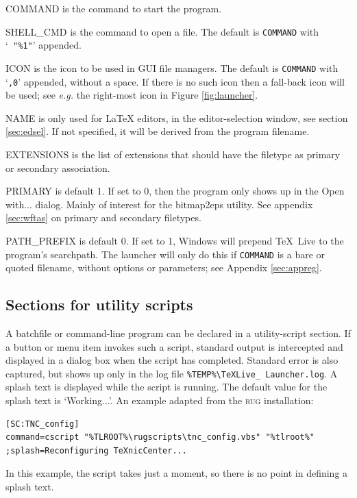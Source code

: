 \documentclass[11pt,a4paper,oneside]{report}
\def\TL{\TeX~Live}
\def\mysc#1{{\rmfamily\textsc{#1}}}
\def\RUG{\mysc{rug}}
\def\dbr{\discretionary{}{}{}}
\let\bsl\textbackslash
\def\bslb{\bsl\discretionary{}{}{}}
\newenvironment{ttdesc}{%
  \def\descriptionlabel##1{\hspace\labelsep\ttfamily\selectfont ##1}%
  \description}{\enddescription}
\begin{document}
\begin{ttdesc}
\item [COMMAND] is the command to start the program.
\item [SHELL\_CMD] is the command to open a file. The default is
  \texttt{COMMAND} with `\texttt{~"\%1"}' appended.
\item[ICON] is the icon to be used in GUI file managers. The default
  is \texttt{COMMAND} with `\texttt{,0}' appended, without a
  space. If there is no such icon then a fall-back icon will be
  used; see \emph{e.g.} the right-most icon in Figure
  \ref{fig:launcher}.
\item[NAME] is only used for \LaTeX{} editors, in the
  editor-selection window, see section \ref{sec:edsel}. If not
  specified, it will be derived from the program filename.
\item[EXTENSIONS] is the list of extensions that should have the
  filetype as primary or secondary association.
\item[PRIMARY] is default 1. If set to 0, then the program only
  shows up in the Open with... dialog. Mainly of interest for the
  bitmap2eps utility. See appendix \ref{sec:wftas} on primary and
  secondary filetypes.
\item[PATH\_PREFIX] is default 0. If set to 1, Windows will
  prepend \TL{} to the program's searchpath. The launcher will only
  do this if \texttt{COMMAND} is a bare or quoted filename, without
  options or parameters; see Appendix \ref{sec:appreg}.
\end{ttdesc}

\subsection{Sections for utility scripts}
\label{sec:utscripts}

A batchfile or command-line program can be declared in a
utility-script section. If a button or menu item invokes such a
script, standard output is intercepted and displayed in a dialog box
when the script has completed.  Standard error is also captured, but
shows up only in the log file \texttt{\%TEMP\%\bslb TeXLive\_\dbr
  Launcher.\dbr log}. A splash text is displayed while the script is
running. The default value for the splash text is `Working...'. An
example adapted from the \RUG{} installation:
\begin{verbatim}
[SC:TNC_config]
command=cscript "%TLROOT%\rugscripts\tnc_config.vbs" "%tlroot%"
;splash=Reconfiguring TeXnicCenter...
\end{verbatim}
In this example, the script takes just a moment, so there is no
point in defining a splash text.
\end{document}
